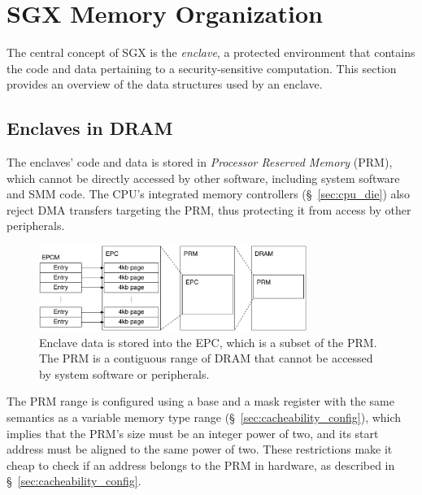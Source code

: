 \section{SGX Memory Organization}
\label{sec:memory}

The central concept of SGX is the \textit{enclave}, a protected environment
that contains the code and data pertaining to a security-sensitive computation.
This section provides an overview of the data structures used by an enclave.


\subsection{Enclaves in DRAM}
\label{sec:prm}


The enclaves' code and data is stored in \textit{Processor Reserved Memory}
(PRM), which cannot be directly accessed by other software, including system
software and SMM code. The CPU's integrated memory controllers
(\S~\ref{sec:cpu_die}) also reject DMA transfers targeting the PRM, thus
protecting it from access by other peripherals.

\begin{figure}[hbt]
  \centering
  \includegraphics[width=87mm]{figures/sgx_epc.pdf}
  \caption{
    Enclave data is stored into the EPC, which is a subset of the PRM. The
    PRM is a contiguous range of DRAM that cannot be accessed by system
    software or peripherals.
  }
  \label{fig:sgx_epc}
\end{figure}


The PRM range is configured using a base and a mask register with the same
semantics as a variable memory type range (\S~\ref{sec:cacheability_config}),
which implies that the PRM's size must be an integer power of two, and its
start address must be aligned to the same power of two. These restrictions make
it cheap to check if an address belongs to the PRM in hardware, as described in
\S~\ref{sec:cacheability_config}.

